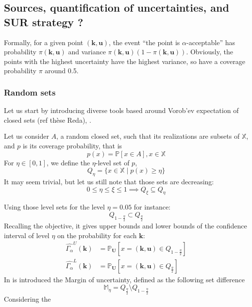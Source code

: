 \documentclass[a4paper,11pt]{article}
\newcommand{\Prob}{\mathbb{P}}
\newcommand{\Xspace}{\mathbb{X}}
\begin{document}
\subsection{Sources, quantification of uncertainties, and SUR strategy ?}

Formally, for a given point $(\mathbf{k},\mathbf{u})$, the event ``the point is $\alpha$-acceptable'' has probability $\pi(\mathbf{k},\mathbf{u})$ and variance $\pi(\mathbf{k},\mathbf{u}) (1-\pi(\mathbf{k},\mathbf{u}))$. Obviously, the points with the highest uncertainty have the highest variance, so have a coverage probability $\pi$ around 0.5.

\subsubsection{Random sets}
Let us start by introducing diverse tools based around Vorob'ev expectation of closed sets (ref thèse Reda), \cite{heinrich_level_2012}.


Let us consider $A$, a random closed set, such that its realizations are subsets of $\Xspace$, and $p$ is its coverage probability, that is
\begin{equation}
  p(x) = \Prob\left[x\in A\right], x\in\Xspace
\end{equation}
For $\eta \in [0, 1]$, we define the $\eta$-level set of $p$,
\begin{equation}
  Q_{\eta} = \{x\in\Xspace \mid p(x) \geq \eta \}
\end{equation}
It may seem trivial, but let us still note that those sets are decreasing:
\begin{equation}
  0\leq \eta \leq \xi \leq 1 \implies Q_{\xi} \subseteq Q_{\eta}
\end{equation}

Using those level sets for the level $\eta=0.05$ for instance:
\begin{equation}
  Q_{1-\frac{\eta}{2}} \subset Q_{\frac{\eta}{2}}
\end{equation}
Recalling the objective, it gives upper bounds and lower bounds of the confidence interval of level $\eta$ on the probability for each $\mathbf{k}$:
\begin{align}
  \hat{\Gamma_{\alpha}}^{U}(\mathbf{k}) &= \Prob_\mathbf{U}\left[x=(\mathbf{k},\mathbf{u}) \in Q_{1-\frac{\eta}{2}}\right] \\
  \hat{\Gamma_{\alpha}}^{L}(\mathbf{k}) &= \Prob_\mathbf{U}\left[x=(\mathbf{k},\mathbf{u}) \in Q_{\frac{\eta}{2}}\right]
\end{align}
In \cite{dubourg_reliability-based_2011} is introduced the Margin of uncertainty, defined as the following set difference
\begin{equation}
  \mathbb{M}_{\eta} = Q_{\frac{\eta}{2}} \setminus Q_{1-\frac{\eta}{2}}
\end{equation}
Considering the 
\end{document}
